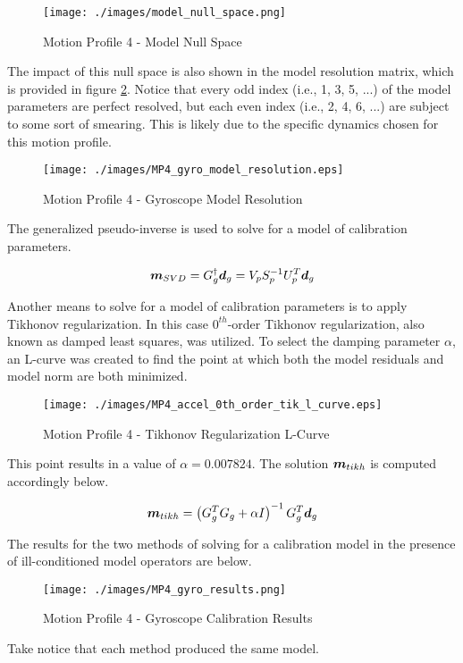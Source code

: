 \begin{figure}[h] 
	\centering
	\texttt{[image: ./images/model\_null\_space.png]}
	\caption{Motion Profile 4 - Model Null Space}
	\label{fig: MP4 model null space}
\end{figure}
\FloatBarrier

The impact of this null space is also shown in the model resolution matrix, which is provided in figure \ref{fig: MP4 gyro model resolution}. Notice that every odd index (i.e., 1, 3, 5, ...) of the model parameters are perfect resolved, but each even index (i.e., 2, 4, 6, ...) are subject to some sort of smearing. This is likely due to the specific dynamics chosen for this motion profile.

\begin{figure}[h] 
	\centering
	\texttt{[image: ./images/MP4\_gyro\_model\_resolution.eps]}
	\caption{Motion Profile 4 - Gyroscope Model Resolution}
	\label{fig: MP4 gyro model resolution}
\end{figure}
\FloatBarrier

The generalized pseudo-inverse is used to solve for a model of calibration parameters. 

\begin{align}
	\boldsymbol{m}_{SVD} = G_g^\dagger \boldsymbol{d}_g = V_p S_p^{-1} U_p^T \boldsymbol{d}_g
\end{align}

Another means to solve for a model of calibration parameters is to apply Tikhonov regularization. In this case $0^{th}$-order Tikhonov regularization, also known as damped least squares, was utilized. To select the damping parameter $\alpha$, an L-curve was created to find the point at which both the model residuals and model norm are both minimized. 

\begin{figure}[h] 
	\centering
	\texttt{[image: ./images/MP4\_accel\_0th\_order\_tik\_l\_curve.eps]}
	\caption{Motion Profile 4 - Tikhonov Regularization L-Curve}
	\label{fig: MP4 gyro tikh l-curve}
\end{figure}
\FloatBarrier

This point results in a value of $\alpha = 0.007824$. The solution $\boldsymbol{m}_{tikh}$ is computed accordingly below. 

\begin{align}
	\boldsymbol{m}_{tikh} = \left(G_g^T G_g + \alpha I\right)^{-1} G_g^T \boldsymbol{d}_g
\end{align}

The results for the two methods of solving for a calibration model in the presence of ill-conditioned model operators are below. 

\begin{figure}[h] 
	\centering
	\texttt{[image: ./images/MP4\_gyro\_results.png]}
	\caption{Motion Profile 4 - Gyroscope Calibration Results}
	\label{fig: MP4 gyro results}
\end{figure}
\FloatBarrier

Take notice that each method produced the same model. 

